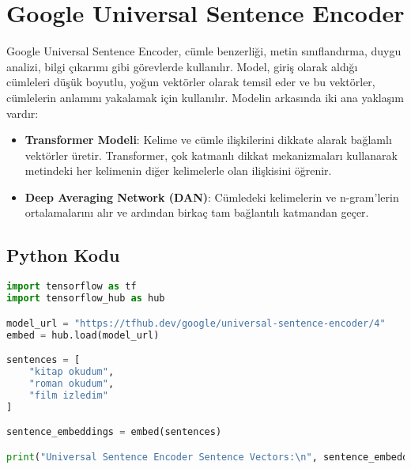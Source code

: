 \section{Google Universal Sentence Encoder}

Google Universal Sentence Encoder, cümle benzerliği, metin sınıflandırma, duygu analizi, bilgi çıkarımı gibi görevlerde kullanılır. Model, giriş olarak aldığı cümleleri düşük boyutlu, yoğun vektörler olarak temsil eder ve bu vektörler, cümlelerin anlamını yakalamak için kullanılır. Modelin arkasında iki ana yaklaşım vardır:

\begin{itemize}
    \item \textbf{Transformer Modeli}: Kelime ve cümle ilişkilerini dikkate alarak bağlamlı vektörler üretir. Transformer, çok katmanlı dikkat mekanizmaları kullanarak metindeki her kelimenin diğer kelimelerle olan ilişkisini öğrenir.
    \item \textbf{Deep Averaging Network (DAN)}: Cümledeki kelimelerin ve n-gram'lerin ortalamalarını alır ve ardından birkaç tam bağlantılı katmandan geçer.
\end{itemize}

\subsection{Python Kodu}

\begin{lstlisting}[language=Python]
import tensorflow as tf
import tensorflow_hub as hub

model_url = "https://tfhub.dev/google/universal-sentence-encoder/4"
embed = hub.load(model_url)

sentences = [
    "kitap okudum",
    "roman okudum",
    "film izledim"
]

sentence_embeddings = embed(sentences)

print("Universal Sentence Encoder Sentence Vectors:\n", sentence_embeddings.numpy())
\end{lstlisting}

\newpage